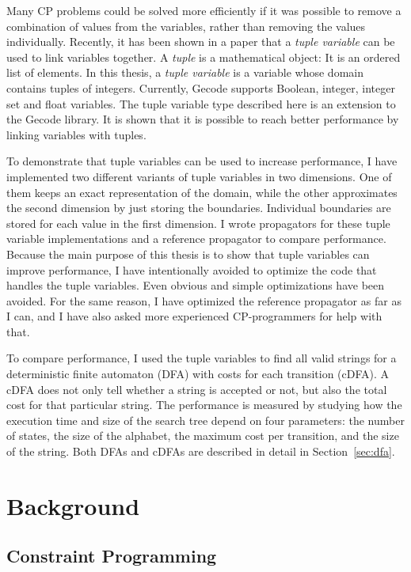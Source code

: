 \documentclass[a4paper,11pt]{article}
\begin{document}
Many CP problems could be solved more efficiently if it was possible to remove a combination of values from the variables, rather than removing the values individually. Recently, it has been shown in a paper \cite{Monette771427} that a \textit{tuple variable} can be used to link variables together. A \textit{tuple} is a mathematical object: It is an ordered list of elements. In this thesis, a \textit{tuple variable} is a variable whose domain contains tuples of integers. Currently, Gecode supports Boolean, integer, integer set and float variables. The tuple variable type described here is an extension to the Gecode library. It is shown that it is possible to reach better performance by linking variables with tuples.

To demonstrate that tuple variables can be used to increase performance, I have implemented two different variants of tuple variables in two dimensions. One of them keeps an exact representation of the domain, while the other approximates the second dimension by just storing the boundaries. Individual boundaries are stored for each value in the first dimension. I wrote propagators for these tuple variable implementations and a reference propagator to compare performance. Because the main purpose of this thesis is to show that tuple variables can improve performance, I have intentionally avoided to optimize the code that handles the tuple variables. Even obvious and simple optimizations have been avoided. For the same reason, I have optimized the reference propagator as far as I can, and I have also asked more experienced CP-programmers for help with that.

To compare performance, I used the tuple variables to find all valid strings for a deterministic finite automaton (DFA) with costs for each transition (cDFA). A cDFA does not only tell whether a string is accepted or not, but also the total cost for that particular string. The performance is measured by studying how the execution time and size of the search tree depend on four parameters: the number of states, the size of the alphabet, the maximum cost per transition, and the size of the string. Both DFAs and cDFAs are described in detail in Section~\ref{sec:dfa}.

\section{Background}
\subsection{Constraint Programming}
\end{document}

